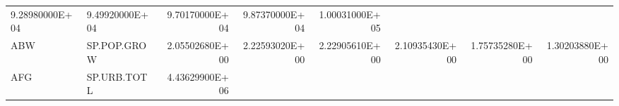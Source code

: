 \documentclass[]{article}
\begin{document}
\begin{longtable}[]{@{}llrrrrrr@{}}
\begin{minipage}[t]{0.11\columnwidth}
9.28980000E+04\strut
\end{minipage} & \begin{minipage}[t]{0.11\columnwidth}\raggedleft\strut
9.49920000E+04\strut
\end{minipage} & \begin{minipage}[t]{0.11\columnwidth}\raggedleft\strut
9.70170000E+04\strut
\end{minipage} & \begin{minipage}[t]{0.11\columnwidth}\raggedleft\strut
9.87370000E+04\strut
\end{minipage} & \begin{minipage}[t]{0.11\columnwidth}\raggedleft\strut
1.00031000E+05\strut
\end{minipage}\tabularnewline
\begin{minipage}[t]{0.06\columnwidth}\raggedright\strut
ABW\strut
\end{minipage} & \begin{minipage}[t]{0.08\columnwidth}\raggedright\strut
SP.POP.GROW\strut
\end{minipage} & \begin{minipage}[t]{0.11\columnwidth}\raggedleft\strut
2.05502680E+00\strut
\end{minipage} & \begin{minipage}[t]{0.11\columnwidth}\raggedleft\strut
2.22593020E+00\strut
\end{minipage} & \begin{minipage}[t]{0.11\columnwidth}\raggedleft\strut
2.22905610E+00\strut
\end{minipage} & \begin{minipage}[t]{0.11\columnwidth}\raggedleft\strut
2.10935430E+00\strut
\end{minipage} & \begin{minipage}[t]{0.11\columnwidth}\raggedleft\strut
1.75735280E+00\strut
\end{minipage} & \begin{minipage}[t]{0.11\columnwidth}\raggedleft\strut
1.30203880E+00\strut
\end{minipage}\tabularnewline
\begin{minipage}[t]{0.06\columnwidth}\raggedright\strut
AFG\strut
\end{minipage} & \begin{minipage}[t]{0.08\columnwidth}\raggedright\strut
SP.URB.TOTL\strut
\end{minipage} & \begin{minipage}[t]{0.11\columnwidth}\raggedleft\strut
4.43629900E+06\strut

\end{minipage}
\end{longtable}
\end{document}
